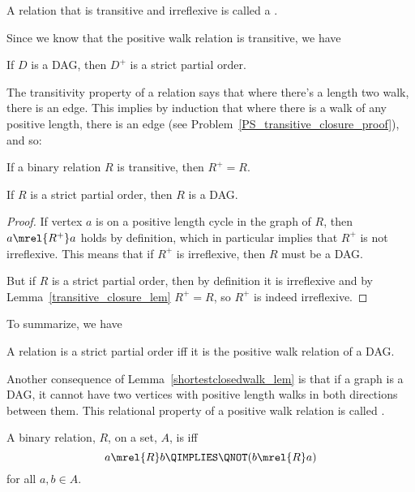 \begin{definition}
A relation that is transitive and irreflexive is called a .
\end{definition}

Since we know that the positive walk relation is transitive, we have
\begin{lemma}
If $D$ is a DAG, then $D^+$ is a strict partial order.
\end{lemma}

The transitivity property of a relation says that where there's a
length two walk, there is an edge.  This implies by induction that
where there is a walk of any positive length, there is an edge (see
Problem~\ref{PS_transitive_closure_proof}), and so:

\begin{lemma}\label{transitive_closure_lem}
If a binary relation $R$ is transitive, then $R^+ = R$.
\end{lemma}

\begin{corollary}
If $R$ is a strict partial order, then $R$ is a DAG.
\end{corollary}

\begin{proof}
If vertex $a$ is on a positive length cycle in the graph of $R$, then
$a \mrel{R^+} a$ holds by definition, which in particular implies that
$R^+$ is not irreflexive.  This means that if $R^+$ is irreflexive,
then $R$ must be a DAG.

But if $R$ is a strict partial order, then by definition it is
irreflexive and by Lemma~\ref{transitive_closure_lem} $R^+ = R$, so
$R^+$ is indeed irreflexive.
\end{proof}

To summarize, we have
\begin{theorem}\label{SPOiffDAG}
A relation is a strict partial order iff it is the positive walk relation of a DAG.
\end{theorem}

Another consequence of Lemma~\ref{shortestclosedwalk_lem} is that if a
graph is a DAG, it cannot have two vertices with positive length walks
in both directions between them.  This relational property of a
positive walk relation is called .

\begin{definition}
A binary relation, $R$, on a set, $A$, is  iff
\[
a \mrel{R} b \QIMPLIES \QNOT(b \mrel{R} a)
\]
for all $a,b \in A$.
\end{definition}

